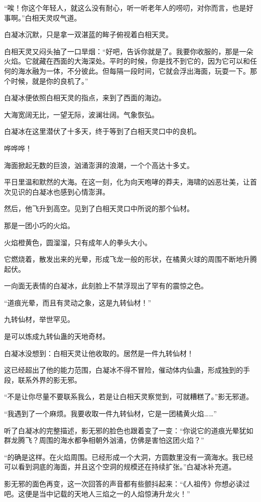 \begin{this_body}
“唉！你这个年轻人，就这么没有耐心，听一听老年人的唠叨，对你而言，也是好事啊。”白相天灵叹气道。

白凝冰沉默，只是拿一双湛蓝的眸子俯视着白相天灵。

白相天灵又闷头抽了一口旱烟：“好吧，告诉你就是了。我要你收服的，那是一朵火焰。它就藏在西面的大海深处。平时的时候，你是找不到它的，因为它可以和任何的海水融为一体，不分彼此。但每隔一段时间，它就会浮出海面，玩耍一下。那个时候，就是你的良机了。”

白凝冰便依照白相天灵的指点，来到了西面的海边。

大海宽阔无比，一望无际，波澜壮阔。气象恢弘。

白凝冰在这里潜伏了十多天，终于等到了白相天灵口中的良机。

哗哗哗！

海面掀起无数的巨浪，汹涌澎湃的浪潮，一个个高达十多丈。

平日里温和默然的大海。在这一刻，化为向天咆哮的莽夫，海啸的凶恶壮美，让首次见识的白凝冰也感到心情澎湃。

然后，他飞升到高空。见到了白相天灵口中所说的那个仙材。

那是一团小巧的火焰。

火焰橙黄色，圆溜溜，只有成年人的拳头大小。

它燃烧着，散发出来的光晕，形成飞龙一般的形状，在橘黄火球的周围不断地升腾起伏。

一向面无表情的白凝冰，此刻脸上不禁浮现出了罕有的震惊之色。

“道痕光晕，而且有灵动之象，这是九转仙材！”

九转仙材，举世罕见。

是可以炼成九转仙蛊的天地奇材。

白凝冰没想到：白相天灵让他收取的。居然是一件九转仙材！

这已经超出了他的能力范围，白凝冰不得不冒险，催动体内仙蛊，形成独到的手段，联系外界的影无邪。

“不是让你尽量不要联系我么，若是让白相天灵察觉到，可就糟糕了。”影无邪道。

“我遇到了一个麻烦。我要收取一件九转仙材，它是一团橘黄火焰……”

听了白凝冰的完整描述，影无邪的脸色也跟着变了一变：“你说它的道痕光晕犹如群龙腾飞？周围的海水都争相朝外汹涌，仿佛是害怕这团火焰？”

“的确是这样。在火焰周围。已经形成一个大洞，方圆数里没有一滴海水。我已经可以看到洞底的海面，并且这个空洞的规模还在持续扩张。”白凝冰补充道。

影无邪的面色再变，这一次回答的声音都有些颤抖起来：“《人祖传》你想必读过吧。这便是当中记载的天地人三焰之一的人焰惊涛升龙火！”


\end{this_body}
